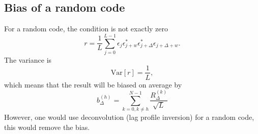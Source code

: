\documentclass[18pt,a4paper]{extarticle}
\begin{document}
\subsection{Bias of a random code}
For a random code, the condition is not exactly zero
\begin{equation}
r = \frac{1}{L}\sum^{L-1}_{j=0}\epsilon_{j}\epsilon_{j+w}^* \epsilon_{j+\Delta}^*\epsilon_{j + \Delta + w}.
\end{equation}
The variance is
\begin{equation}
\mathrm{Var}[r] = \frac{1}{L},
\end{equation}
which means that the result will be biased on average by
\begin{equation}
b^{(h)}_\Delta = \sum_{k=0,k\neq h}^{N-1}\frac{R^{(k)}_\Delta}{\sqrt{L}}
\end{equation}
However, one would use deconvolution (lag profile inversion) for a random code, this would remove the bias.
\end{document}
